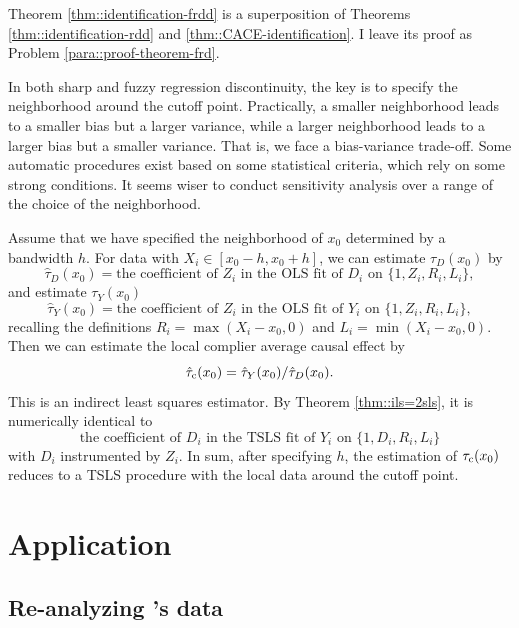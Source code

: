  Theorem \ref{thm::identification-frdd} is a superposition of Theorems \ref{thm::identification-rdd} and \ref{thm::CACE-identification}. I leave its proof as Problem \ref{para::proof-theorem-frd}. 
 

In both sharp and fuzzy regression discontinuity,  the key is to specify the neighborhood around the cutoff point. Practically, a smaller neighborhood leads to a smaller bias but a larger variance, while a larger neighborhood leads to a larger bias but a smaller variance. That is, we face a bias-variance trade-off. Some automatic procedures exist based on some statistical criteria, which rely on some strong conditions. It seems wiser to conduct sensitivity analysis over a range of the choice of the neighborhood. 

Assume that we have specified the neighborhood of $x_0$ determined by a bandwidth $h$. 
For data with $X_i \in [x_0-h, x_0 + h]$, we can estimate $\tau_D(x_0) $ by  
$$
\hat{\tau}_D(x_0) = \text{the coefficient of } Z_i
\text{ in the OLS fit of } D_i \text{ on } \{1, Z_i, R_i, L_i\},
$$
and estimate $\tau_Y(x_0) $ 
$$
\hat{\tau}_Y(x_0) = \text{the coefficient of } Z_i
\text{ in the OLS fit of } Y_i \text{ on } \{1, Z_i, R_i, L_i\},
$$
recalling the definitions $R_i = \max(X_i - x_0, 0)$ and $L_i= \min (X_i - x_0, 0)$. Then we can estimate the local complier average causal effect by  
$$
\hat\tau_{\textup{c}}(x_0)  = \hat{\tau}_Y(x_0) / \hat{\tau}_D(x_0).
$$ 
This is an indirect least squares estimator. By Theorem \ref{thm::ils=2sls}, it is numerically identical to
$$
\text{the coefficient of } D_i
\text{ in the TSLS fit of } Y_i \text{ on } \{1, D_i, R_i, L_i\}  
$$
with $D_i$ instrumented by $Z_i$. In sum, after specifying $h$, the estimation of  $ \tau_{\textup{c}}(x_0)$ reduces to a TSLS procedure with the local data around the cutoff point.  


\section{Application}
 \label{sec::application-frdd}

\subsection{Re-analyzing \citet{asher2020rural}'s data}
\label{sec::indian-road-data}

